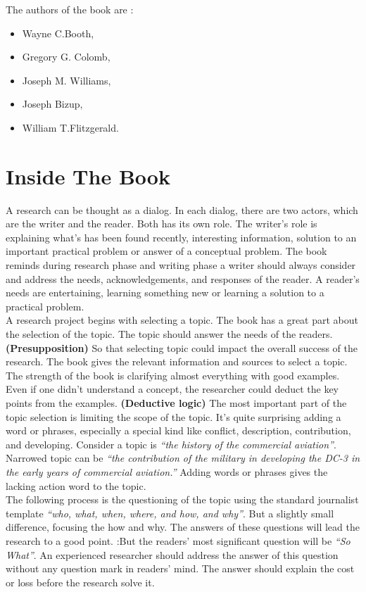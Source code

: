 \documentclass[11pt]{article} %
\begin{document}
	The authors of the book are :
		\begin{itemize}
			\item Wayne C.Booth,
			\item Gregory G. Colomb,
			\item Joseph M. Williams,
			\item Joseph Bizup,
			\item William T.Flitzgerald.
		\end{itemize}
	
\section{Inside The Book}
	A research can be thought as a dialog. In each dialog, there are two actors, which are the writer and the reader. Both has its own role. The writer's role is explaining what's has been found recently, interesting information, solution to an important practical problem or answer of a conceptual problem. The book reminds during research phase and writing phase a writer should always consider and address the needs, acknowledgements, and responses of the reader. A reader's needs are entertaining, learning something new or learning a solution to a practical problem.\\

A research project begins with selecting a topic. The book has a great part about the selection of the topic. The topic should answer the needs of the readers. \textbf{(Presupposition)} So that selecting topic could impact the overall success of the research. The book gives the relevant information and sources to select a topic. The strength of the book is clarifying almost everything with good examples. Even if one didn't understand a concept, the researcher could deduct the key points from the examples. \textbf{(Deductive logic)} The most important part of the topic selection is limiting the scope of the topic. It's quite surprising adding a word or phrases, especially a special kind like conflict, description, contribution, and developing. Consider a topic is \textit{“the history of the commercial aviation”}. Narrowed topic can be \textit{“the contribution of the military in developing the DC-3 in the early years of commercial aviation.”} Adding words or phrases gives the lacking action word to the topic. \\

The following process is the questioning of the topic using the standard journalist template \textit{“who, what, when, where, and how, and why”}. But a slightly small difference, focusing the how and why. The answers of these questions will lead the research to a good point. :But the readers' most significant question will be \textit{“So What”}. An experienced researcher should address the answer of this question without any question mark in readers' mind. The answer should explain the cost or loss before the research solve it.\\
\end{document}
